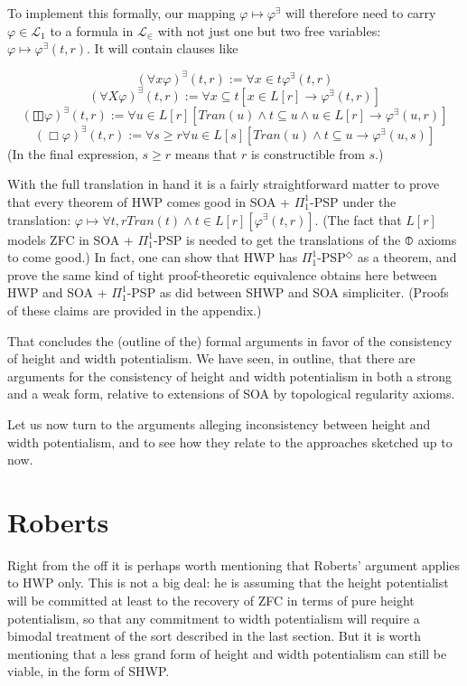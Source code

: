 \documentclass{article}
\begin{document}
To implement this formally, 
our mapping $\varphi \mapsto \varphi^\exists$ will therefore 
need to carry $\varphi \in \mathcal{L}_1$ to a formula in $\mathcal{L}_\in$ with 
not just one but two free variables: $\varphi \mapsto \varphi^\exists(t, r)$. It will 
contain clauses like 

\[ (\forall x \varphi)^\exists(t, r) := \forall x \in t \varphi^\exists(t, r) \]
\[ (\forall X \varphi)^\exists(t, r) := \forall x \subseteq t [x \in L[r] \rightarrow \varphi^\exists(t, r)] \]
\[ (\boxbar \varphi)^\exists(t, r) := \forall u \in L[r] [Tran(u) \wedge t \subseteq u \wedge u \in L[r] \rightarrow \varphi^\exists(u, r)]\]
\[ (\Box \varphi)^\exists(t, r) := \forall s \geq r \forall u \in L[s] [Tran(u) \wedge t \subseteq u  \rightarrow \varphi^\exists(u, s)]\]
(In the final expression, $s \geq r$ means that $r$ is constructible from $s$.)

With the full translation in hand 
it is a fairly straightforward matter to prove that every theorem of HWP 
comes good in SOA + $\Pi_1^1$-PSP under the translation: 
$\varphi \mapsto \forall t, r Tran(t) \wedge t \in L[r][ \varphi^\exists(t, r)]$.
(The fact that $L[r]$ models ZFC
in SOA + $\Pi_1^1$-PSP is needed to get the translations of the $\circledbar$ 
axioms to come good.)
In fact, one can show that HWP has $\Pi_1^1$-PSP$^\Diamond$ as a theorem, and 
prove the same kind of tight proof-theoretic equivalence obtains here 
between HWP and SOA + $\Pi_1^1$-PSP as did between SHWP and SOA simpliciter. (Proofs 
of these claims are provided in the appendix.)

That concludes the (outline of the) formal arguments 
in favor of the consistency of height and width potentialism.
We have seen, in outline, that there are arguments for the consistency of 
height and width potentialism in both a strong and a weak form, relative to 
extensions of SOA by topological regularity axioms.

Let us 
now turn to the arguments alleging inconsistency between height and width 
potentialism, and to see how they relate to the approaches sketched up to now.

\section{Roberts}

Right from the off it is perhaps worth mentioning 
that Roberts' argument applies to HWP only. This is not a big deal: 
he is assuming that the height potentialist will be committed at least 
to the recovery of ZFC in terms of pure height potentialism, so that 
any commitment to width potentialism will require a bimodal treatment 
of the sort described in the last section. But it is worth mentioning 
that a less grand form of height and width potentialism can still be viable,
in the form of SHWP.
\end{document}
